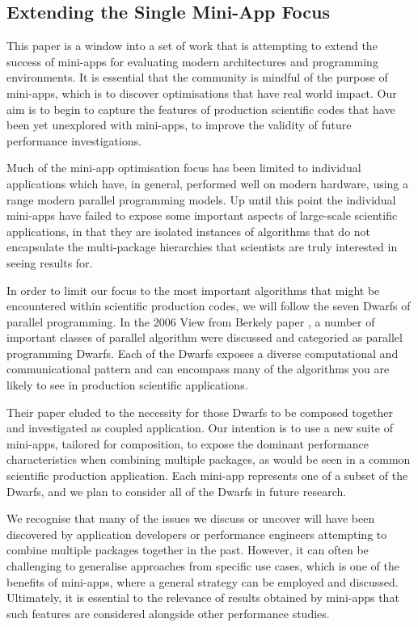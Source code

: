 \documentclass[runningheads,a4paper]{llncs}
\begin{document}
\subsection{Extending the Single Mini-App Focus}

This paper is a window into a set of work that is attempting to extend the success of mini-apps for evaluating modern architectures and programming environments. It is essential that the community is mindful of the purpose of mini-apps, which is to discover optimisations that have real world impact. Our aim is to begin to capture the features of production scientific codes that have been yet unexplored with mini-apps, to improve the validity of future performance investigations. 

Much of the mini-app optimisation focus has been limited to individual applications which have, in general, performed well on modern hardware, using a range modern parallel programming models. Up until this point the individual mini-apps have failed to expose some important aspects of large-scale scientific applications, in that they are isolated instances of algorithms that do not encapsulate the multi-package hierarchies that scientists are truly interested in seeing results for.

In order to limit our focus to the most important algorithms that might be encountered within scientific production codes, we will follow the seven Dwarfs of parallel programming. In the 2006 View from Berkely paper \cite{Asanovic2006}, a number of important classes of parallel algorithm were discussed and categoried as parallel programming Dwarfs. Each of the Dwarfs exposes a diverse computational and communicational pattern and can encompass many of the algorithms you are likely to see in production scientific applications.  

Their paper eluded to the necessity for those Dwarfs to be composed together and investigated as coupled application. Our intention is to use a new suite of mini-apps, tailored for composition, to expose the dominant performance characteristics when combining multiple packages, as would be seen in a common scientific production application. Each mini-app represents one of a subset of the Dwarfs, and we plan to consider all of the Dwarfs in future research.

We recognise that many of the issues we discuss or uncover will have been discovered by application developers or performance engineers attempting to combine multiple packages together in the past. However, it can often be challenging to generalise approaches from specific use cases, which is one of the benefits of mini-apps, where a general strategy can be employed and discussed. Ultimately, it is essential to the relevance of results obtained by mini-apps that such features are considered alongside other performance studies. 
\end{document}
